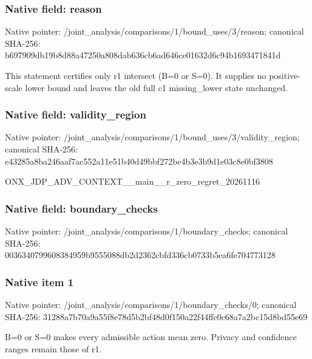 \documentclass[10pt,a4paper]{article}
\begin{document}
\subsubsection{Native field: reason}
Native pointer: /joint\_\allowbreak{}analysis/comparisons/1/bound\_\allowbreak{}uses/3/reason; canonical SHA-256: b697909db19b8d88a47250a808dab636cb6ad646ce01632d6c94b1693471841d

\begingroup\raggedright\sloppy This statement certifies only r1 intersect (B=\allowbreak{}0 or S=\allowbreak{}0). It supplies no positive-scale lower bound and leaves the old full c1 missing\_\allowbreak{}lower state unchanged.\par\endgroup

\subsubsection{Native field: validity\_\allowbreak{}region}
Native pointer: /joint\_\allowbreak{}analysis/comparisons/1/bound\_\allowbreak{}uses/3/validity\_\allowbreak{}region; canonical SHA-256: e43285a8ba246aaf7ac552a11e51b40d49bbf272be4b3e3b9d1e03c8e0bf3808

\begingroup\raggedright\sloppy ONX\_\allowbreak{}JDP\_\allowbreak{}ADV\_\allowbreak{}CONTEXT\_\allowbreak{}\_\allowbreak{}main\_\allowbreak{}\_\allowbreak{}r\_\allowbreak{}zero\_\allowbreak{}regret\_\allowbreak{}20261116\par\endgroup

\subsubsection{Native field: boundary\_\allowbreak{}checks}
Native pointer: /joint\_\allowbreak{}analysis/comparisons/1/boundary\_\allowbreak{}checks; canonical SHA-256: 0036340799608384959b9555088db2d2362cbfd336cb0733b5ea6fe704773128

\subsubsection{Native item 1}
Native pointer: /joint\_\allowbreak{}analysis/comparisons/1/boundary\_\allowbreak{}checks/0; canonical SHA-256: 31288a7b70a9a55f8e78d5b2bf48d0f150a22f44ffc0c68a7a2bc15d8bd55e69

\begingroup\raggedright\sloppy B=\allowbreak{}0 or S=\allowbreak{}0 makes every admissible action mean zero. Privacy and confidence ranges remain those of r1.\par\endgroup
\end{document}
